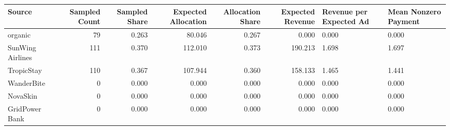 \begin{tabular}{lrrrrr}
\hline
Source & Sampled Count & Sampled Share & Expected Allocation & Allocation Share & Expected Revenue & Revenue per Expected Ad & Mean Nonzero Payment \\
\hline
organic & 79 & 0.263 & 80.046 & 0.267 & 0.000 & 0.000 & 0.000 \\
SunWing Airlines & 111 & 0.370 & 112.010 & 0.373 & 190.213 & 1.698 & 1.697 \\
TropicStay & 110 & 0.367 & 107.944 & 0.360 & 158.133 & 1.465 & 1.441 \\
WanderBite & 0 & 0.000 & 0.000 & 0.000 & 0.000 & 0.000 & 0.000 \\
NovaSkin & 0 & 0.000 & 0.000 & 0.000 & 0.000 & 0.000 & 0.000 \\
GridPower Bank & 0 & 0.000 & 0.000 & 0.000 & 0.000 & 0.000 & 0.000 \\
\hline
\end{tabular}
